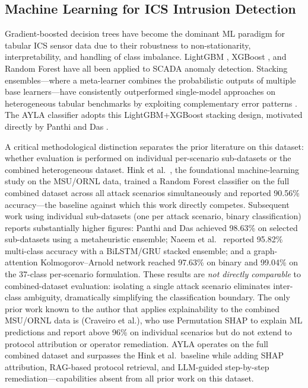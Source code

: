 \documentclass[twocolumn, 10pt, letterpaper]{article}
\begin{document}
\subsection{Machine Learning for ICS Intrusion Detection}

Gradient-boosted decision trees have become the dominant ML paradigm for
tabular ICS sensor data due to their robustness to non-stationarity, interpretability,
and handling of class imbalance.
LightGBM \cite{ke2017lightgbm}, XGBoost \cite{chen2016xgboost}, and
Random Forest have all been applied to SCADA anomaly detection.
Stacking ensembles---where a meta-learner combines the probabilistic outputs of
multiple base learners---have consistently outperformed single-model approaches
on heterogeneous tabular benchmarks by exploiting complementary error patterns
\cite{panthi2022ensemble}.
The AYLA classifier adopts this LightGBM+XGBoost stacking design, motivated
directly by Panthi and Das \cite{panthi2022ensemble}.

A critical methodological distinction separates the prior literature on this
dataset: whether evaluation is performed on individual per-scenario sub-datasets
or the combined heterogeneous dataset.
Hink et al.\ \cite{hink2014ml}, the foundational machine-learning study on the
MSU/ORNL data, trained a Random Forest classifier on the full combined dataset
across all attack scenarios simultaneously and reported 90.56\% accuracy---the
baseline against which this work directly competes.
Subsequent work using individual sub-datasets (one per attack scenario, binary
classification) reports substantially higher figures: Panthi and Das
\cite{panthi2022ensemble} achieved 98.63\% on selected sub-datasets using a
metaheuristic ensemble; Naeem et al.\ \cite{naeem2025deep} reported 95.82\%
multi-class accuracy with a BiLSTM/GRU stacked ensemble; and a graph-attention
Kolmogorov--Arnold network \cite{graphkan2025} reached 97.63\% on binary and
99.04\% on the 37-class per-scenario formulation.
These results are \textit{not directly comparable} to combined-dataset evaluation:
isolating a single attack scenario eliminates inter-class ambiguity, dramatically
simplifying the classification boundary.
The only prior work known to the author that applies explainability to the combined
MSU/ORNL data is \cite{shapgrid2026} (Craveiro et al.), who use Permutation SHAP to explain
ML predictions and report above 96\% on individual scenarios but do not extend
to protocol attribution or operator remediation.
AYLA operates on the full combined dataset and surpasses the Hink et al.\ baseline
while adding SHAP attribution, RAG-based protocol retrieval, and LLM-guided
step-by-step remediation---capabilities absent from all prior work on this dataset.
\end{document}
